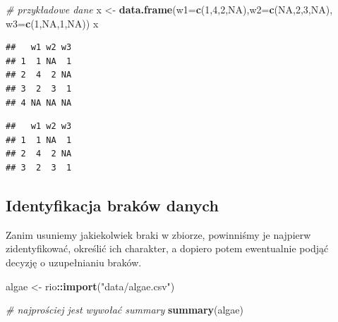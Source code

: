 \documentclass[]{book}
\newenvironment{Shaded}{\begin{snugshade}}{\end{snugshade}}
\newcommand{\CommentTok}[1]{\textcolor[rgb]{0.56,0.35,0.01}{\textit{#1}}}
\newcommand{\DataTypeTok}[1]{\textcolor[rgb]{0.13,0.29,0.53}{#1}}
\newcommand{\DecValTok}[1]{\textcolor[rgb]{0.00,0.00,0.81}{#1}}
\newcommand{\KeywordTok}[1]{\textcolor[rgb]{0.13,0.29,0.53}{\textbf{#1}}}
\newcommand{\NormalTok}[1]{#1}
\newcommand{\OperatorTok}[1]{\textcolor[rgb]{0.81,0.36,0.00}{\textbf{#1}}}
\newcommand{\OtherTok}[1]{\textcolor[rgb]{0.56,0.35,0.01}{#1}}
\newcommand{\StringTok}[1]{\textcolor[rgb]{0.31,0.60,0.02}{#1}}
\theoremstyle{plain}
\theoremstyle{definition}
\begin{document}
\begin{Shaded}
\begin{Highlighting}[]
\CommentTok{# przykładowe dane}
\NormalTok{x <-}\StringTok{ }\KeywordTok{data.frame}\NormalTok{(}\DataTypeTok{w1=}\KeywordTok{c}\NormalTok{(}\DecValTok{1}\NormalTok{,}\DecValTok{4}\NormalTok{,}\DecValTok{2}\NormalTok{,}\OtherTok{NA}\NormalTok{),}\DataTypeTok{w2=}\KeywordTok{c}\NormalTok{(}\OtherTok{NA}\NormalTok{,}\DecValTok{2}\NormalTok{,}\DecValTok{3}\NormalTok{,}\OtherTok{NA}\NormalTok{), }\DataTypeTok{w3=}\KeywordTok{c}\NormalTok{(}\DecValTok{1}\NormalTok{,}\OtherTok{NA}\NormalTok{,}\DecValTok{1}\NormalTok{,}\OtherTok{NA}\NormalTok{))}
\NormalTok{x}
\end{Highlighting}
\end{Shaded}

\begin{verbatim}
##   w1 w2 w3
## 1  1 NA  1
## 2  4  2 NA
## 3  2  3  1
## 4 NA NA NA
\end{verbatim}

\begin{Shaded}
\end{Shaded}

\begin{verbatim}
##   w1 w2 w3
## 1  1 NA  1
## 2  4  2 NA
## 3  2  3  1
\end{verbatim}

\hypertarget{identyfikacja-brakow-danych}{%
\subsection{Identyfikacja braków danych}\label{identyfikacja-brakow-danych}}

Zanim usuniemy jakiekolwiek braki w zbiorze, powinniśmy je najpierw zidentyfikować, określić ich charakter, a dopiero potem ewentualnie podjąć decyzję o uzupełnianiu braków.

\begin{Shaded}
\begin{Highlighting}[]
\NormalTok{algae <-}\StringTok{ }\NormalTok{rio}\OperatorTok{::}\KeywordTok{import}\NormalTok{(}\StringTok{"data/algae.csv"}\NormalTok{)}

\CommentTok{# najprościej jest wywołać summary}
\KeywordTok{summary}\NormalTok{(algae)}
\end{Highlighting}
\end{Shaded}
\end{document}
